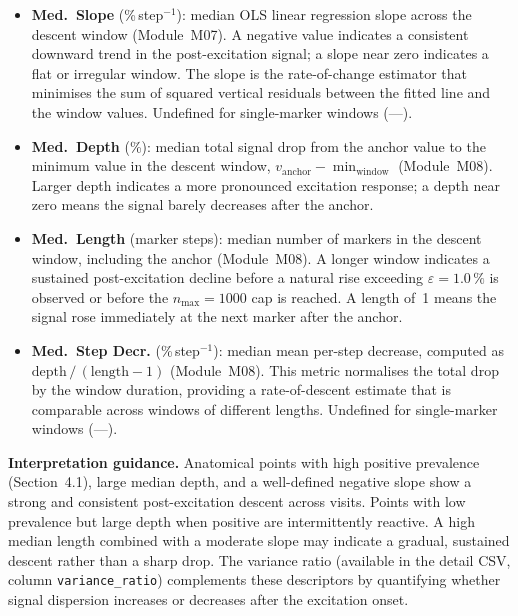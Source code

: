 \documentclass[a4paper,11pt]{article}
\begin{document}
\begin{itemize}

  \item \textbf{Med.\ Slope} (\%\,step$^{-1}$): median OLS linear regression slope across
        the descent window (Module~M07). A negative value indicates a consistent downward
        trend in the post-excitation signal; a slope near zero indicates a flat or irregular
        window. The slope is the rate-of-change estimator that minimises the sum of squared
        vertical residuals between the fitted line and the window values. Undefined for
        single-marker windows (---).

  \item \textbf{Med.\ Depth} (\%): median total signal drop from the anchor value to the
        minimum value in the descent window,
        $v_{\mathrm{anchor}} - \min_{\mathrm{window}}$ (Module~M08). Larger depth indicates
        a more pronounced excitation response; a depth near zero means the signal barely
        decreases after the anchor.

  \item \textbf{Med.\ Length} (marker steps): median number of markers in the descent
        window, including the anchor (Module~M08). A longer window indicates a sustained
        post-excitation decline before a natural rise exceeding
        $\varepsilon = 1.0\,\%$ is observed or before the
        $n_{\max} = 1000$ cap is reached. A length of~1 means the signal rose
        immediately at the next marker after the anchor.

  \item \textbf{Med.\ Step Decr.} (\%\,step$^{-1}$): median mean per-step decrease,
        computed as $\mathrm{depth}\,/\,(\mathrm{length} - 1)$ (Module~M08). This metric
        normalises the total drop by the window duration, providing a rate-of-descent
        estimate that is comparable across windows of different lengths. Undefined for
        single-marker windows (---).

\end{itemize}

\medskip
\noindent\textbf{Interpretation guidance.}
Anatomical points with high positive prevalence (Section~4.1), large median depth, and a
well-defined negative slope show a strong and consistent post-excitation descent across
visits.
Points with low prevalence but large depth when positive are intermittently reactive.
A high median length combined with a moderate slope may indicate a gradual, sustained
descent rather than a sharp drop.
The variance ratio (available in the detail CSV, column \texttt{variance\_ratio}) complements
these descriptors by quantifying whether signal dispersion increases or decreases after the
excitation onset.
\end{document}
